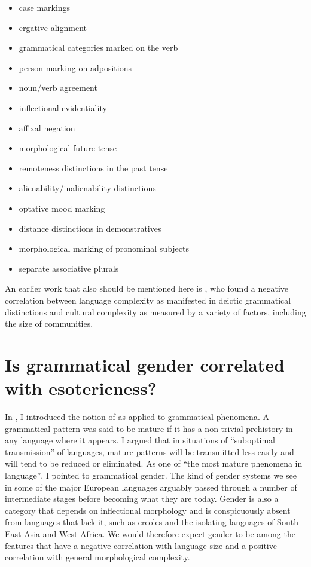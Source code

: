 \documentclass[output=collectionpaper]{langsci/langscibook}
\begin{document}
\begin{itemize}
\item
case markings
\item
ergative alignment
\item
grammatical categories marked on the verb
\item
person marking on adpositions
\item
noun/verb agreement
\item
inflectional evidentiality
\item
affixal negation
\item
morphological future tense
\item
remoteness distinctions in the past tense
\item
alienability/inalienability distinctions
\item
optative mood marking
\item
distance distinctions in demonstratives
\item
morphological marking of pronominal subjects
\item
separate associative plurals
\end{itemize}
\clearpage

An earlier work that also should be mentioned here is \citet{Perkins1992}, who found a negative correlation between language complexity as manifested in deictic grammatical distinctions and cultural complexity as measured by a variety of factors, including the size of communities.

\section{Is grammatical gender correlated with esotericness?}
\largerpage[2]
In \citet{Dahl2004}, I introduced the notion of  as applied to grammatical phenomena. A grammatical pattern was said to be mature if it has a non-trivial prehistory in any language where it appears. I argued that in situations of ``suboptimal transmission'' of languages, mature patterns will be transmitted less easily and will tend to be reduced or eliminated.  As one of ``the most mature phenomena in language'', I pointed to grammatical gender. The kind of gender systems we see in some of the major European languages arguably passed through a number of intermediate stages before becoming what they are today. Gender is also a category that depends on inflectional morphology and is conspicuously absent from languages that lack it, such as creoles and the isolating languages of South East Asia and West Africa. We would therefore expect gender to be among the features that have a negative correlation with language size and a positive correlation with general morphological complexity.
\end{document}
